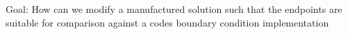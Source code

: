Goal: How can we modify a manufactured solution such that the endpoints are 
suitable for comparison against a codes boundary condition implementation


